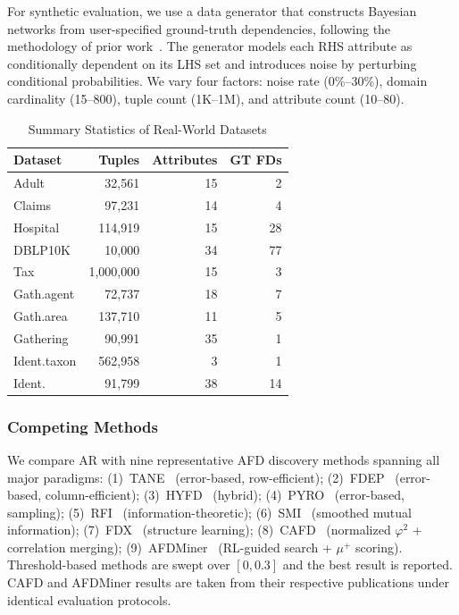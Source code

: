 \documentclass[conference]{IEEEtran}
\begin{document}
For synthetic evaluation, we use a data generator that constructs Bayesian networks from user-specified ground-truth dependencies, following the methodology of prior work~\cite{afdminer,fdx}. The generator models each RHS attribute as conditionally dependent on its LHS set and introduces noise by perturbing conditional probabilities. We vary four factors: noise rate (0\%--30\%), domain cardinality (15--800), tuple count (1K--1M), and attribute count (10--80).

\begin{table}[t]
\caption{Summary Statistics of Real-World Datasets}
\label{tab:datasets}
\centering
\begin{tabular}{lrrr}
\toprule
\textbf{Dataset} & \textbf{Tuples} & \textbf{Attributes} & \textbf{GT FDs} \\
\midrule
Adult & 32,561 & 15 & 2 \\
Claims & 97,231 & 14 & 4 \\
Hospital & 114,919 & 15 & 28 \\
DBLP10K & 10,000 & 34 & 77 \\
Tax & 1,000,000 & 15 & 3 \\
Gath.agent & 72,737 & 18 & 7 \\
Gath.area & 137,710 & 11 & 5 \\
Gathering & 90,991 & 35 & 1 \\
Ident.taxon & 562,958 & 3 & 1 \\
Ident. & 91,799 & 38 & 14 \\
\bottomrule
\end{tabular}
\end{table}

\subsubsection{Competing Methods}
We compare AR with nine representative AFD discovery methods spanning all major paradigms: (1)~TANE~\cite{tane} (error-based, row-efficient); (2)~FDEP~\cite{fdep} (error-based, column-efficient); (3)~HYFD~\cite{hyfd} (hybrid); (4)~PYRO~\cite{pyro} (error-based, sampling); (5)~RFI~\cite{rfi} (information-theoretic); (6)~SMI~\cite{smi} (smoothed mutual information); (7)~FDX~\cite{fdx} (structure learning); (8)~CAFD~\cite{cafdui} (normalized $\varphi^2$ + correlation merging); (9)~AFDMiner~\cite{afdminer} (RL-guided search + $\mu^+$ scoring). Threshold-based methods are swept over $[0, 0.3]$ and the best result is reported. CAFD and AFDMiner results are taken from their respective publications under identical evaluation protocols.
\end{document}
